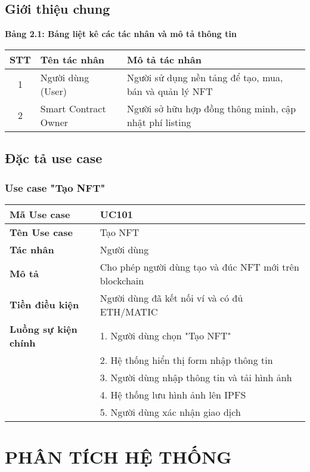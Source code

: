 \documentclass[a4paper,12pt]{report}
\begin{document}
\section{Giới thiệu chung}
\textbf{Bảng 2.1: Bảng liệt kê các tác nhân và mô tả thông tin}
\begin{center}
\begin{tabular}{|c|l|p{8cm}|}
    \hline
    \textbf{STT} & \textbf{Tên tác nhân} & \textbf{Mô tả tác nhân} \\
    \hline
    1 & Người dùng (User) & Người sử dụng nền tảng để tạo, mua, bán và quản lý NFT \\
    \hline
    2 & Smart Contract Owner & Người sở hữu hợp đồng thông minh, cập nhật phí listing \\
    \hline
\end{tabular}
\end{center}

\section{Đặc tả use case}
\subsection{Use case "Tạo NFT"}
\begin{tabular}{|l|p{10cm}|}
    \hline
    \textbf{Mã Use case} & UC101 \\
    \hline
    \textbf{Tên Use case} & Tạo NFT \\
    \hline
    \textbf{Tác nhân} & Người dùng \\
    \hline
    \textbf{Mô tả} & Cho phép người dùng tạo và đúc NFT mới trên blockchain \\
    \hline
    \textbf{Tiền điều kiện} & Người dùng đã kết nối ví và có đủ ETH/MATIC \\
    \hline
    \textbf{Luồng sự kiện chính} & 1. Người dùng chọn "Tạo NFT" \\
    & 2. Hệ thống hiển thị form nhập thông tin \\
    & 3. Người dùng nhập thông tin và tải hình ảnh \\
    & 4. Hệ thống lưu hình ảnh lên IPFS \\
    & 5. Người dùng xác nhận giao dịch \\
    \hline
\end{tabular}

\chapter{PHÂN TÍCH HỆ THỐNG}
\end{document}
